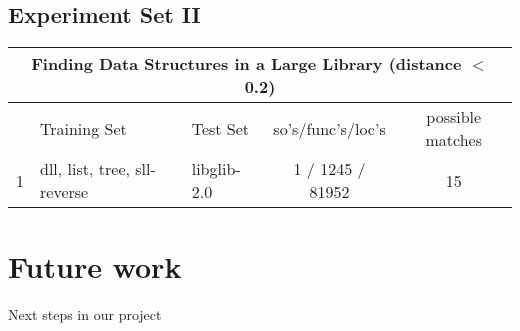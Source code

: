 \documentclass[12pt]{article}
\begin{document}
\subsection*{Experiment Set II}

\begin{tabular}{|l|l|l|c|c|}
\hline
\multicolumn{5}{|c|}{Finding Data Structures in a Large Library  (distance $<$ 0.2)} \\
\hline
  & Training Set                 & Test Set    & so's/func's/loc's & possible matches \\
\hline
1 & dll, list, tree, sll-reverse & libglib-2.0 & 1 / 1245 / 81952  & 15               \\
\hline
\end{tabular}

\section{Future work}

Next steps in our project



\end{document}
